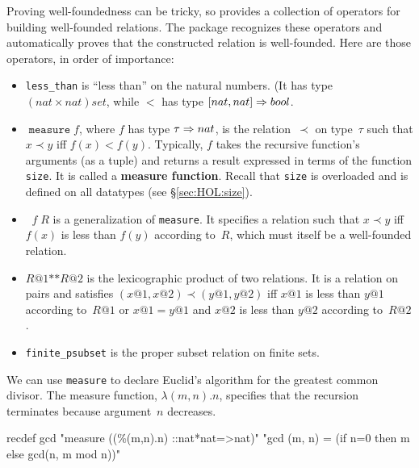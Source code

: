 Proving well-foundedness can be tricky, so {\HOL} provides a collection of
operators for building well-founded relations.  The package recognizes these
operators and automatically proves that the constructed relation is
well-founded.  Here are those operators, in order of importance:
\begin{itemize}
\item \texttt{less_than} is ``less than'' on the natural numbers.
  (It has type $(nat\times nat)set$, while $<$ has type $[nat,nat]\Rightarrow bool$.
  
\item $\mathop{\mathtt{measure}} f$, where $f$ has type $\tau\Rightarrow nat$, is the
  relation~$\prec$ on type~$\tau$ such that $x\prec y$ iff $f(x)<f(y)$.
  Typically, $f$ takes the recursive function's arguments (as a tuple) and
  returns a result expressed in terms of the function \texttt{size}.  It is
  called a \textbf{measure function}.  Recall that \texttt{size} is overloaded
  and is defined on all datatypes (see \S\ref{sec:HOL:size}).
                                                    
\item $\mathop{\mathtt{inv_image}} f\;R$ is a generalization of
  \texttt{measure}.  It specifies a relation such that $x\prec y$ iff $f(x)$
  is less than $f(y)$ according to~$R$, which must itself be a well-founded
  relation.

\item $R@1\texttt{**}R@2$ is the lexicographic product of two relations.  It
  is a relation on pairs and satisfies $(x@1,x@2)\prec(y@1,y@2)$ iff $x@1$
  is less than $y@1$ according to~$R@1$ or $x@1=y@1$ and $x@2$
  is less than $y@2$ according to~$R@2$.

\item \texttt{finite_psubset} is the proper subset relation on finite sets.
\end{itemize}

We can use \texttt{measure} to declare Euclid's algorithm for the greatest
common divisor.  The measure function, $\lambda(m,n).n$, specifies that the
recursion terminates because argument~$n$ decreases.
\begin{ttbox}
recdef gcd "measure ((\%(m,n).n) ::nat*nat=>nat)"
    "gcd (m, n) = (if n=0 then m else gcd(n, m mod n))"
\end{ttbox}

